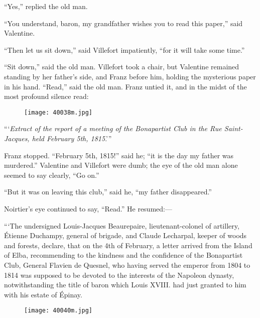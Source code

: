 “Yes,” replied the old man.

“You understand, baron, my grandfather wishes you to read this paper,”
said Valentine.

“Then let us sit down,” said Villefort impatiently, “for it will take
some time.”

“Sit down,” said the old man. Villefort took a chair, but Valentine
remained standing by her father’s side, and Franz before him, holding
the mysterious paper in his hand. “Read,” said the old man. Franz
untied it, and in the midst of the most profound silence read:

\begin{figure}[ht]
\texttt{[image: 40038m.jpg]}
\end{figure}

“‘\textit{Extract of the report of a meeting of the Bonapartist Club in the
Rue Saint-Jacques, held February 5th, 1815}.’”

Franz stopped. “February 5th, 1815!” said he; “it is the day my father
was murdered.” Valentine and Villefort were dumb; the eye of the old
man alone seemed to say clearly, “Go on.”

“But it was on leaving this club,” said he, “my father disappeared.”

Noirtier’s eye continued to say, “Read.” He resumed:—

“‘The undersigned Louis-Jacques Beaurepaire, lieutenant-colonel of
artillery, Étienne Duchampy, general of brigade, and Claude Lecharpal,
keeper of woods and forests, declare, that on the 4th of February, a
letter arrived from the Island of Elba, recommending to the kindness
and the confidence of the Bonapartist Club, General Flavien de Quesnel,
who having served the emperor from 1804 to 1814 was supposed to be
devoted to the interests of the Napoleon dynasty, notwithstanding the
title of baron which Louis XVIII. had just granted to him with his
estate of Épinay.

\begin{figure}[ht]
\texttt{[image: 40040m.jpg]}
\end{figure}

